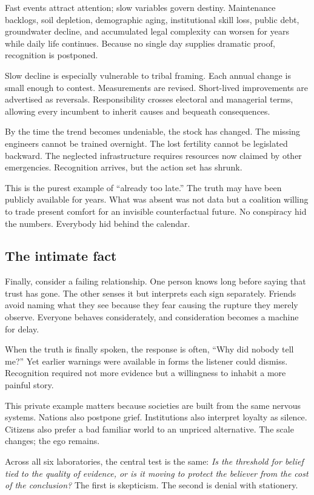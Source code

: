 ﻿\documentclass[12pt,a4paper]{book}
\begin{document}
Fast events attract attention; slow variables govern destiny. Maintenance backlogs, soil depletion, demographic aging, institutional skill loss, public debt, groundwater decline, and accumulated legal complexity can worsen for years while daily life continues. Because no single day supplies dramatic proof, recognition is postponed.

Slow decline is especially vulnerable to tribal framing. Each annual change is small enough to contest. Measurements are revised. Short-lived improvements are advertised as reversals. Responsibility crosses electoral and managerial terms, allowing every incumbent to inherit causes and bequeath consequences.

By the time the trend becomes undeniable, the stock has changed. The missing engineers cannot be trained overnight. The lost fertility cannot be legislated backward. The neglected infrastructure requires resources now claimed by other emergencies. Recognition arrives, but the action set has shrunk.

This is the purest example of “already too late.” The truth may have been publicly available for years. What was absent was not data but a coalition willing to trade present comfort for an invisible counterfactual future. No conspiracy hid the numbers. Everybody hid behind the calendar.

\subsection{The intimate fact}

Finally, consider a failing relationship. One person knows long before saying that trust has gone. The other senses it but interprets each sign separately. Friends avoid naming what they see because they fear causing the rupture they merely observe. Everyone behaves considerately, and consideration becomes a machine for delay.

When the truth is finally spoken, the response is often, “Why did nobody tell me?” Yet earlier warnings were available in forms the listener could dismiss. Recognition required not more evidence but a willingness to inhabit a more painful story.

This private example matters because societies are built from the same nervous systems. Nations also postpone grief. Institutions also interpret loyalty as silence. Citizens also prefer a bad familiar world to an unpriced alternative. The scale changes; the ego remains.

Across all six laboratories, the central test is the same: \emph{Is the threshold for belief tied to the quality of evidence, or is it moving to protect the believer from the cost of the conclusion?} The first is skepticism. The second is denial with stationery.
\end{document}
